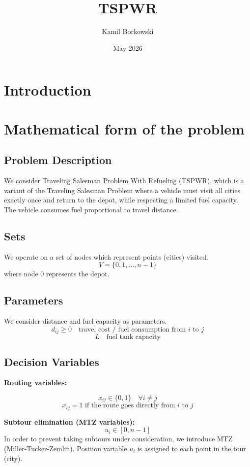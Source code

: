 \documentclass{article}
\title{TSPWR}
\author{Kamil Borkowski}
\date{May 2026}
\begin{document}
\maketitle

\section{Introduction}


\section{Mathematical form of the problem}

\subsection*{Problem Description}
We consider Traveling Salesman Problem With Refueling (TSPWR), which is a variant of the Traveling Salesman Problem where a vehicle must visit all cities exactly once and return to the depot, while respecting a limited fuel capacity. The vehicle consumes fuel proportional to travel distance.

\subsection*{Sets}
We operate on a set of nodes which represent points (cities) visited.
\[
V = \{0,1,\dots,n-1\}
\]
where node $0$ represents the depot.

\subsection*{Parameters}
We consider distance and fuel capacity as parameters.
\[
d_{ij} \ge 0 \quad \text{travel cost / fuel consumption from } i \text{ to } j
\]
\[
L \quad \text{fuel tank capacity}
\]

\subsection*{Decision Variables}

\textbf{Routing variables:}

\[
x_{ij} \in \{0,1\} \quad \forall i \neq j
\]
\[
x_{ij} = 1 \text{ if the route goes directly from } i \text{ to } j
\]

\textbf{Subtour elimination (MTZ variables):}
\[
u_i \in [0, n-1]
\]
In order to prevent taking subtours under consideration, we introduce MTZ (Miller-Tucker-Zemlin). Position variable $u_i$ is assigned to each point in the tour (city). 
\end{document}
